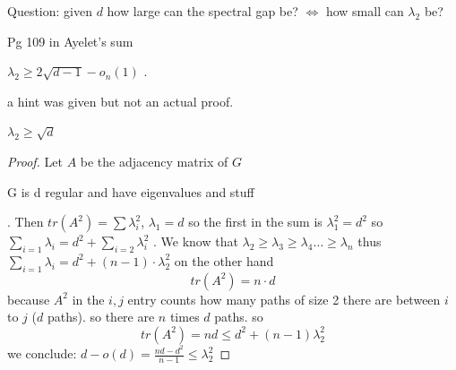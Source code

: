 Question: given $d$ how large can the spectral gap be? $\iff$ how
small can $\lambda_{2}$ be?
\begin{thm}
\begin{insight}
Pg 109 in Ayelet's sum%
\end{insight}
$\lambda_{2}\ge2\sqrt{d-1}-o_{n}\left(1\right)$ .

a hint was given but not an actual proof.
\end{thm}

\begin{thm}
$\lambda_{2}\ge\sqrt{d}$
\begin{proof}
Let $A$ be the adjacency matrix of $G$%
\begin{insight}
G is d regular and have eigenvalues and stuff%
\end{insight}
. Then $tr\left(A^{2}\right)=\sum\lambda_{i}^{2}$, $\lambda_{1}=d$
so the first in the sum is $\lambda_{1}^{2}=d^{2}$ so $\sum_{i=1}\lambda_{i}=d^{2}+\sum_{i=2}\lambda_{i}^{2}$
. We know that $\lambda_{2}\ge\lambda_{3}\ge\lambda_{4}\dots\ge\lambda_{n}$
thus $\sum_{i=1}\lambda_{i}=d^{2}+\left(n-1\right)\cdot\lambda_{2}^{2}$
on the other hand 
\[
tr\left(A^{2}\right)=n\cdot d
\]
because $A^{2}$ in the $i,j$ entry counts how many paths of size
2 there are between $i$to $j$ ($d$ paths). so there are $n$ times
$d$ paths. so
\[
tr\left(A^{2}\right)=nd\le d^{2}+\left(n-1\right)\lambda_{2}^{2}
\]
 we conclude: $d-o\left(d\right)=\frac{nd-d^{2}}{n-1}\le\lambda_{2}^{2}$
\end{proof}
\end{thm}

